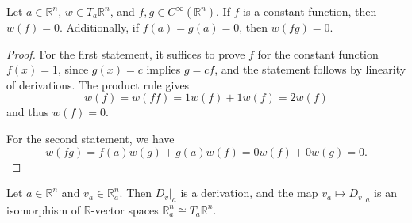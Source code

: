 \begin{lemma}\label{1.2.8}
	Let $a\in\mathbb{R} ^n$, $w\in T_a\mathbb{R} ^n$, and $f,g\in C^\infty (\mathbb{R} ^n)$. If $f$ is a constant function, then $w(f)=0$. Additionally, if $f(a)=g(a)=0$, then $w(fg)=0$.
\end{lemma}
\begin{proof}
	For the first statement, it suffices to prove $f$ for the constant function $f(x)=1$, since $g(x)=c$ implies $g=cf$, and the statement follows by linearity of derivations. The product rule gives
	\[
		w(f)=w(ff)=1w(f)+1w(f)=2w(f)
	\]
	and thus $w(f)=0$.

	For the second statement, we have
	\[
		w(fg)=f(a)w(g)+g(a)w(f)=0w(f)+0w(g)=0
	.\]
\end{proof}

\begin{proposition}\label{1.2.9}
	Let $a\in\mathbb{R} ^n$ and $v_a\in\mathbb{R} _a^n$. Then $D_v|_a$ is a derivation, and the map $v_a \mapsto D_v|_a$ is an isomorphism of $\mathbb{R} $-vector spaces $\mathbb{R} _a^n \cong T_a\mathbb{R} ^n$.
\end{proposition}
